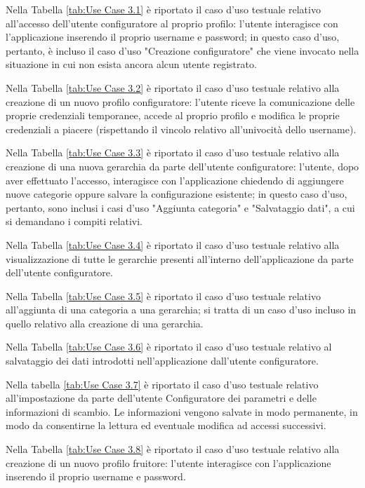 Nella Tabella \ref{tab:Use Case 3.1} è riportato il caso d'uso testuale relativo all'accesso dell'utente configuratore al proprio profilo: l'utente interagisce con l'applicazione inserendo il proprio username e password; in questo caso d'uso, pertanto, è incluso il caso d'uso "Creazione configuratore" che viene invocato nella situazione in cui non esista ancora alcun utente registrato.\bigskip

Nella Tabella \ref{tab:Use Case 3.2} è riportato il caso d'uso testuale relativo alla creazione di un nuovo profilo configuratore: l'utente riceve la comunicazione delle proprie credenziali temporanee, accede al proprio profilo e modifica le proprie credenziali a piacere (rispettando il vincolo relativo all'univocità dello username).\bigskip

Nella Tabella \ref{tab:Use Case 3.3} è riportato il caso d'uso testuale relativo alla creazione di una nuova gerarchia da parte dell'utente configuratore: l'utente, dopo aver effettuato l'accesso, interagisce con l'applicazione chiedendo di aggiungere nuove categorie oppure salvare la configurazione esistente; in questo caso d'uso, pertanto, sono inclusi i casi d'uso "Aggiunta categoria" e "Salvataggio dati", a cui si demandano i compiti relativi.\bigskip

Nella Tabella \ref{tab:Use Case 3.4} è riportato il caso d'uso testuale relativo alla visualizzazione di tutte le gerarchie presenti all'interno dell'applicazione da parte dell'utente configuratore.\bigskip

Nella Tabella \ref{tab:Use Case 3.5} è riportato il caso d'uso testuale relativo all'aggiunta di una categoria a una gerarchia; si tratta di un caso d'uso incluso in quello relativo alla creazione di una gerarchia.\bigskip

Nella Tabella \ref{tab:Use Case 3.6} è riportato il caso d'uso testuale relativo al salvataggio dei dati introdotti nell'applicazione dall'utente configuratore.\bigskip

Nella tabella \ref{tab:Use Case 3.7} è riportato il caso d'uso testuale relativo all'impostazione da parte dell'utente Configuratore dei parametri e delle informazioni di scambio. Le informazioni vengono salvate in modo permanente, in modo da consentirne la lettura ed eventuale modifica ad accessi successivi.\bigskip

Nella Tabella \ref{tab:Use Case 3.8} è riportato il caso d'uso testuale relativo alla creazione di un nuovo profilo fruitore: l'utente interagisce con l'applicazione inserendo il proprio username e password.\bigskip

